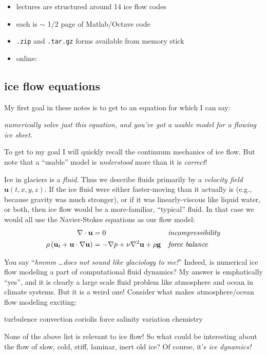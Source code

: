 \documentclass[titlepage,letterpaper,final,11pt]{scrartcl}
\begin{document}
\begin{itemize}
\item lectures are structured around 14 ice flow codes
\item each is $\sim$ 1/2 page of Matlab/Octave code
\item \texttt{.zip} and \texttt{.tar.gz} forms available from memory stick
\item online:

\centerline{}
\end{itemize}


\subsection{ice flow equations}

My first goal in these notes is to get to an equation for which I can say:
\begin{center}
\emph{numerically solve just this equation, and you've got a usable model for a flowing ice sheet.}
\end{center}
To get to my goal I will quickly recall the continuum mechanics of ice flow.  But note that a ``usable'' model is \emph{understood} more than it is \emph{correct}!

Ice in glaciers is a \emph{fluid}.  Thus we describe fluids primarily by a \emph{velocity field} $\mathbf{u}(t,x,y,z)$.  If the ice fluid were either faster-moving than it actually is (e.g., because gravity was much stronger), or if it was linearly-viscous like liquid water, or both, then ice flow would be a more-familiar, ``typical'' fluid.  In that case we would all use the Navier-Stokes equations as our flow model:
\begin{align}
\nabla \cdot \mathbf{u} &= 0 &&\text{\emph{incompressibility}} \label{incompressible} \\
\rho \left(\mathbf{u}_t + \mathbf{u}\cdot\nabla \mathbf{u}\right) &= -\nabla p + \nu \nabla^2 \mathbf{u} + \rho \mathbf{g} &&\text{\emph{force balance}} \label{stokes}
\end{align}

You say ``\emph{hmmm} \dots \emph{does not sound like glaciology to me!}''  Indeed, is numerical ice flow modeling a part of computational fluid dynamics?  My answer is emphatically ``yes'', and it is clearly a large scale fluid problem like atmosphere and ocean in climate systems.  But it is a weird one!  Consider what makes atmosphere/ocean flow modeling exciting:
  \begin{center} turbulence \qquad convection \qquad  coriolis force  \qquad salinity variation \qquad chemistry
  \end{center}
None of the above list is relevant to ice flow!  So what could be interesting about the flow of slow, cold, stiff, laminar, inert old ice?  Of course, it's \emph{ice dynamics!}
\end{document}
